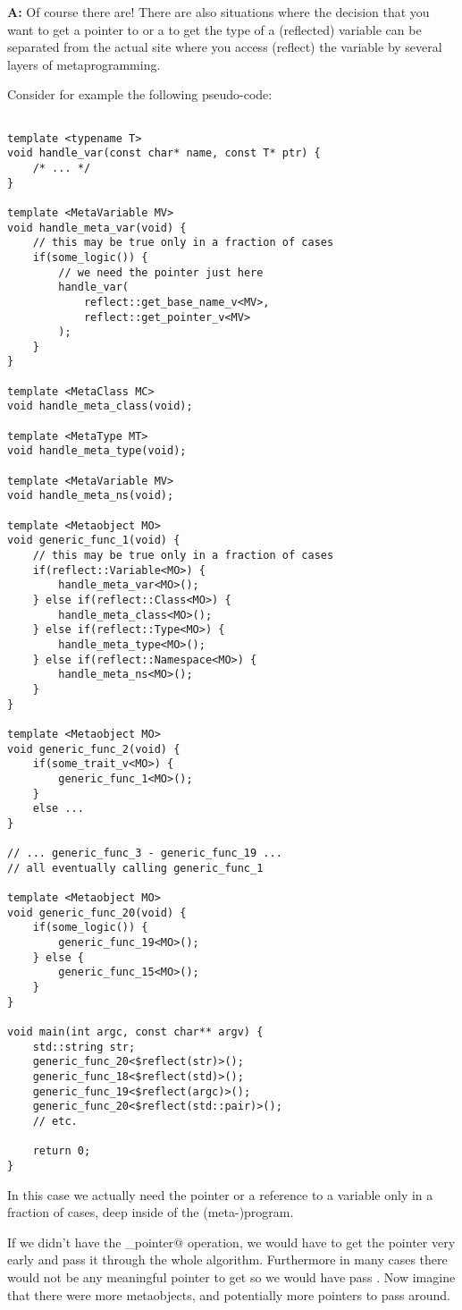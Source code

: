 \textbf{A:} Of course there are! There are also situations where the decision
that you want to get a pointer to or a to get the type of a (reflected) variable
can be separated from the actual site where you access (reflect) the variable by
several layers of metaprogramming.

Consider for example the following pseudo-code:

\begin{verbatim}

template <typename T>
void handle_var(const char* name, const T* ptr) {
	/* ... */
}

template <MetaVariable MV>
void handle_meta_var(void) {
	// this may be true only in a fraction of cases
	if(some_logic()) {
		// we need the pointer just here
		handle_var(
			reflect::get_base_name_v<MV>,
			reflect::get_pointer_v<MV>
		);
	}
}

template <MetaClass MC>
void handle_meta_class(void);

template <MetaType MT>
void handle_meta_type(void);

template <MetaVariable MV>
void handle_meta_ns(void);

template <Metaobject MO>
void generic_func_1(void) {
	// this may be true only in a fraction of cases
	if(reflect::Variable<MO>) {
		handle_meta_var<MO>();
	} else if(reflect::Class<MO>) {
		handle_meta_class<MO>();
	} else if(reflect::Type<MO>) {
		handle_meta_type<MO>();
	} else if(reflect::Namespace<MO>) {
		handle_meta_ns<MO>();
	}
}

template <Metaobject MO>
void generic_func_2(void) {
	if(some_trait_v<MO>) {
		generic_func_1<MO>();
	}
	else ...
}

// ... generic_func_3 - generic_func_19 ...
// all eventually calling generic_func_1

template <Metaobject MO>
void generic_func_20(void) {
	if(some_logic()) {
		generic_func_19<MO>();
	} else {
		generic_func_15<MO>();
	}
}

void main(int argc, const char** argv) {
	std::string str;
	generic_func_20<$reflect(str)>();
	generic_func_18<$reflect(std)>();
	generic_func_19<$reflect(argc)>();
	generic_func_20<$reflect(std::pair)>();
	// etc.

	return 0;
}
\end{verbatim}

In this case we actually need the pointer or a reference to a variable
only in a fraction of cases, deep inside of the (meta-)program.

If we didn't have the \verb@get_pointer@ operation, we would have to
get the pointer very early and pass it through the whole algorithm.
Furthermore in many cases there would not be any meaningful pointer to
get so we would have pass \verb@nullptr@. Now imagine that there were more
metaobjects, and potentially more pointers to pass around.

